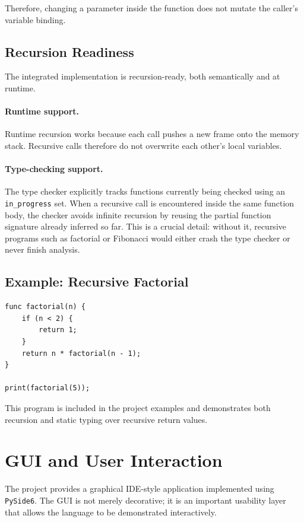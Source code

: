 \documentclass[12pt,a4paper]{article}
\begin{document}
Therefore, changing a parameter inside the function does not mutate the caller's variable binding.

\subsection{Recursion Readiness}
The integrated implementation is recursion-ready, both semantically and at runtime.

\paragraph{Runtime support.}
Runtime recursion works because each call pushes a new frame onto the memory stack. Recursive calls therefore do not overwrite each other's local variables.

\paragraph{Type-checking support.}
The type checker explicitly tracks functions currently being checked using an \texttt{in\_progress} set. When a recursive call is encountered inside the same function body, the checker avoids infinite recursion by reusing the partial function signature already inferred so far. This is a crucial detail: without it, recursive programs such as factorial or Fibonacci would either crash the type checker or never finish analysis.

\subsection{Example: Recursive Factorial}
\begin{lstlisting}
func factorial(n) {
    if (n < 2) {
        return 1;
    }
    return n * factorial(n - 1);
}

print(factorial(5));
\end{lstlisting}

This program is included in the project examples and demonstrates both recursion and static typing over recursive return values.

\section{GUI and User Interaction}
The project provides a graphical IDE-style application implemented using \texttt{PySide6}. The GUI is not merely decorative; it is an important usability layer that allows the language to be demonstrated interactively.
\end{document}
